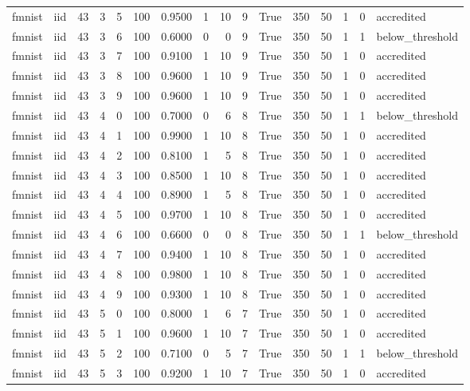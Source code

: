 \begin{tabular}{llrrrrrrrrrrrrrl}
fmnist & iid & 43 & 3 & 5 & 100 & 0.9500 & 1 & 10 & 9 & True & 350 & 50 & 1 & 0 & accredited \\
fmnist & iid & 43 & 3 & 6 & 100 & 0.6000 & 0 & 0 & 9 & True & 350 & 50 & 1 & 1 & below\_threshold \\
fmnist & iid & 43 & 3 & 7 & 100 & 0.9100 & 1 & 10 & 9 & True & 350 & 50 & 1 & 0 & accredited \\
fmnist & iid & 43 & 3 & 8 & 100 & 0.9600 & 1 & 10 & 9 & True & 350 & 50 & 1 & 0 & accredited \\
fmnist & iid & 43 & 3 & 9 & 100 & 0.9600 & 1 & 10 & 9 & True & 350 & 50 & 1 & 0 & accredited \\
fmnist & iid & 43 & 4 & 0 & 100 & 0.7000 & 0 & 6 & 8 & True & 350 & 50 & 1 & 1 & below\_threshold \\
fmnist & iid & 43 & 4 & 1 & 100 & 0.9900 & 1 & 10 & 8 & True & 350 & 50 & 1 & 0 & accredited \\
fmnist & iid & 43 & 4 & 2 & 100 & 0.8100 & 1 & 5 & 8 & True & 350 & 50 & 1 & 0 & accredited \\
fmnist & iid & 43 & 4 & 3 & 100 & 0.8500 & 1 & 10 & 8 & True & 350 & 50 & 1 & 0 & accredited \\
fmnist & iid & 43 & 4 & 4 & 100 & 0.8900 & 1 & 5 & 8 & True & 350 & 50 & 1 & 0 & accredited \\
fmnist & iid & 43 & 4 & 5 & 100 & 0.9700 & 1 & 10 & 8 & True & 350 & 50 & 1 & 0 & accredited \\
fmnist & iid & 43 & 4 & 6 & 100 & 0.6600 & 0 & 0 & 8 & True & 350 & 50 & 1 & 1 & below\_threshold \\
fmnist & iid & 43 & 4 & 7 & 100 & 0.9400 & 1 & 10 & 8 & True & 350 & 50 & 1 & 0 & accredited \\
fmnist & iid & 43 & 4 & 8 & 100 & 0.9800 & 1 & 10 & 8 & True & 350 & 50 & 1 & 0 & accredited \\
fmnist & iid & 43 & 4 & 9 & 100 & 0.9300 & 1 & 10 & 8 & True & 350 & 50 & 1 & 0 & accredited \\
fmnist & iid & 43 & 5 & 0 & 100 & 0.8000 & 1 & 6 & 7 & True & 350 & 50 & 1 & 0 & accredited \\
fmnist & iid & 43 & 5 & 1 & 100 & 0.9600 & 1 & 10 & 7 & True & 350 & 50 & 1 & 0 & accredited \\
fmnist & iid & 43 & 5 & 2 & 100 & 0.7100 & 0 & 5 & 7 & True & 350 & 50 & 1 & 1 & below\_threshold \\
fmnist & iid & 43 & 5 & 3 & 100 & 0.9200 & 1 & 10 & 7 & True & 350 & 50 & 1 & 0 & accredited \\

\end{tabular}
